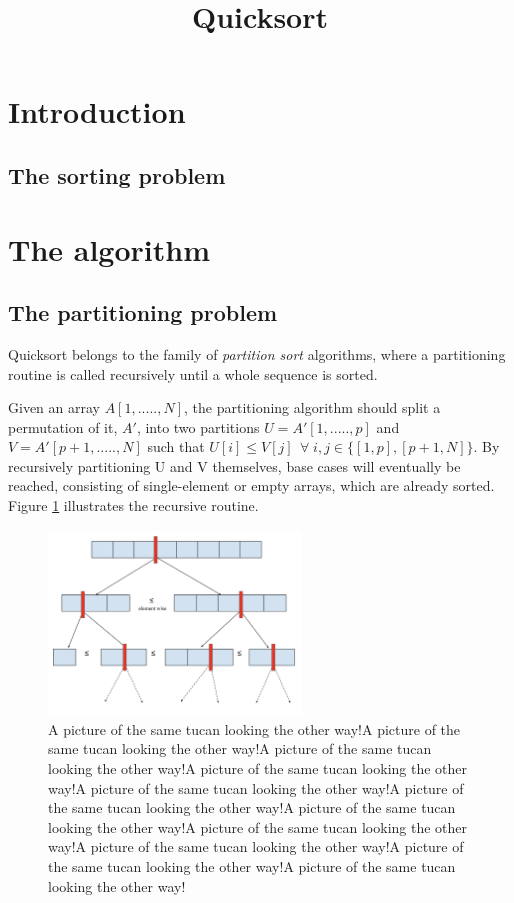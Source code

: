 \documentclass[]{finalproject}
\title{Quicksort}
\subtitle{}
\begin{document}
\maketitle

\section{Introduction} \label{introduction}
\subsection{The sorting problem}

\section{The algorithm}


\subsection{The partitioning problem}

Quicksort belongs to the family of \textit{partition sort} algorithms,
where a partitioning routine is called recursively until a whole sequence is sorted.

Given an array $A[1,.....,N]$, the partitioning algorithm should split a permutation
of it, $A'$, into two partitions $U=A'[1,.....,p]$ and $V=A'[p+1,.....,N]$ such that
$U[i] \leq V[j] \;\, \forall \; i,j \in \{[1,p] , [p+1,N]\}$. 
By recursively partitioning U and V themselves, base cases will eventually be reached,
consisting of single-element or empty arrays, which are already sorted.
Figure \ref{fig:rec-part} illustrates the recursive routine.

\begin{figure}[H]
    \centering
    \includegraphics[width=0.6\textwidth]{recursive_partitioning.png}
    \caption{A picture of the same tucan looking the other way!A picture of the same tucan looking the other way!A picture of the same tucan looking the other way!A picture of the same tucan looking the other way!A picture of the same tucan looking the other way!A picture of the same tucan looking the other way!A picture of the same tucan looking the other way!A picture of the same tucan looking the other way!A picture of the same tucan looking the other way!A picture of the same tucan looking the other way!A picture of the same tucan looking the other way!}
    \label{fig:rec-part}
\end{figure}
\end{document}
